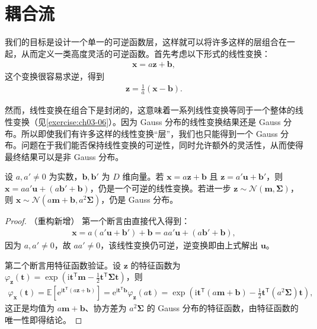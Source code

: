 \documentclass[../../main.tex]{subfiles}
\begin{document}
\section{耦合流}\label{section:ch18-耦合流}

我们的目标是设计一个单一的可逆函数层，这样就可以将许多这样的层组合在一起，从而定义一类高度灵活的可逆函数。首先考虑以下形式的线性变换：
\begin{align}
  \bm{x}=a\bm{z}+\bm{b},\label{align:ch18-线性变换}
\end{align}
这个变换很容易求逆，得到
\begin{align}
  \bm{z}=\frac{1}{a}(\bm{x}-\bm{b}).\label{align:ch18-线性逆}
\end{align}

然而，线性变换在组合下是封闭的，这意味着一系列线性变换等同于一个整体的线性变换（见\cref{exercise:ch03-06}）。因为 Gauss 分布的线性变换结果还是 Gauss 分布。所以即使我们有许多这样的线性变换“层”，我们也只能得到一个 Gauss 分布。问题在于我们能否保持线性变换的可逆性，同时允许额外的灵活性，从而使得最终结果可以是非 Gauss 分布。

\begin{proposition}[线性层的复合]\label{proposition:ch18-线性层复合}
设 $a,a'\neq0$ 为实数，$\bm{b},\bm{b}'$ 为 $D$ 维向量。若 $\bm{x}=a\bm{z}+\bm{b}$ 且 $\bm{z}=a'\bm{u}+\bm{b}'$，则 $\bm{x}=aa'\bm{u}+(a\bm{b}'+\bm{b})$，仍是一个可逆的线性变换。若进一步 $\bm{z}\sim\mathcal{N}(\bm{m},\bm{\Sigma})$，则 $\bm{x}\sim\mathcal{N}(a\bm{m}+\bm{b},a^{2}\bm{\Sigma})$，仍是 Gauss 分布。
\end{proposition}

\begin{proof}（重构新增）
第一个断言由直接代入得到：
\begin{align*}
  \bm{x}=a(a'\bm{u}+\bm{b}')+\bm{b}=aa'\bm{u}+(a\bm{b}'+\bm{b}),
\end{align*}
因为 $a,a'\neq0$，故 $aa'\neq0$，该线性变换仍可逆，逆变换即由上式解出 $\bm{u}$。

第二个断言用特征函数验证。设 $\bm{z}$ 的特征函数为 $\varphi_{\bm{z}}(\bm{t})=\exp\left(\mathrm{i}\bm{t}^{\mathsf T}\bm{m}-\tfrac{1}{2}\bm{t}^{\mathsf T}\bm{\Sigma}\bm{t}\right)$，则
\begin{align*}
  \varphi_{\bm{x}}(\bm{t})=\mathbb{E}\left[\mathrm{e}^{\mathrm{i}\bm{t}^{\mathsf T}(a\bm{z}+\bm{b})}\right]=\mathrm{e}^{\mathrm{i}\bm{t}^{\mathsf T}\bm{b}}\varphi_{\bm{z}}(a\bm{t})=\exp\left(\mathrm{i}\bm{t}^{\mathsf T}(a\bm{m}+\bm{b})-\tfrac{1}{2}\bm{t}^{\mathsf T}(a^{2}\bm{\Sigma})\bm{t}\right),
\end{align*}
这正是均值为 $a\bm{m}+\bm{b}$、协方差为 $a^{2}\bm{\Sigma}$ 的 Gauss 分布的特征函数，由特征函数的唯一性即得结论。
\end{proof}
\end{document}
